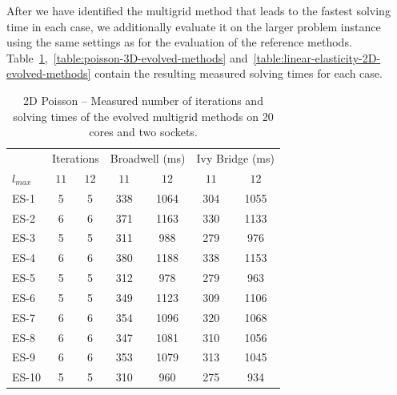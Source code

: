 After we have identified the multigrid method that leads to the fastest solving time in each case, we additionally evaluate it on the larger problem instance using the same settings as for the evaluation of the reference methods.
Table~\ref{table:poisson-2D-evolved-methods},~\ref{table:poisson-3D-evolved-methods} and~\ref{table:linear-elasticity-2D-evolved-methods} contain the resulting measured solving times for each case.
\begin{table}
	\caption[2D Poisson -- Number of iterations and solving times of the evolved methods]{2D Poisson -- Measured number of iterations and solving times of the evolved multigrid methods on 20 cores and two sockets.}
	\label{table:poisson-2D-evolved-methods}
	\centering
	\begin{tabular}{l c c c c c c}
		\toprule
		& \multicolumn{2}{c}{Iterations} & \multicolumn{2}{c}{Broadwell (ms)} & \multicolumn{2}{c}{Ivy Bridge (ms)} \\
		\cmidrule(r){2-3} \cmidrule(r){4-5} \cmidrule(r){6-7}
		$l_{max}$ & $11$& $12$ & $11$ & $12$ & $11$ & $12$\\
		\midrule
		ES-1 & 5 & 5 & 338 & 1064 & 304 & 1055\\
		\midrule
		ES-2 & 6 & 6 & 371 & 1163 & 330 & 1133 \\
		\midrule
		ES-3 & 5 & 5 & 311 & 988 & 279 & 976 \\
		\midrule
		ES-4 & 6 & 6 & 380 & 1188 & 338 & 1153 \\
		\midrule
		ES-5 & 5 & 5 & 312 & 978 & 279 & 963 \\
		\midrule
		ES-6 & 5 & 5 & 349 & 1123 & 309 & 1106 \\
		\midrule
		ES-7 & 6 & 6 & 354 & 1096 & 320 & 1068 \\
		\midrule
		ES-8 & 6 & 6 & 347 & 1081 & 310 & 1056 \\
		\midrule
		ES-9 & 6 & 6 & 353 & 1079 & 313 & 1045 \\
		\midrule
		ES-10 & 5 & 5 & 310 & 960 & 275 & 934 \\
		\bottomrule
	\end{tabular}
\end{table}
